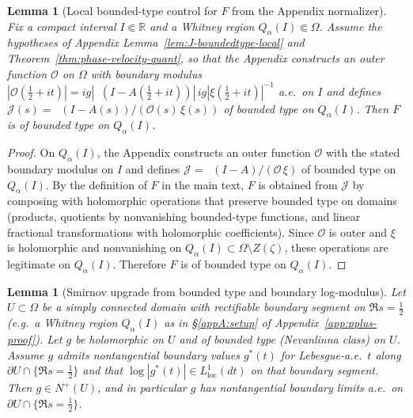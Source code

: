 \documentclass[11pt]{amsart}
\newtheorem{lemma}[theorem]{Lemma}
\theoremstyle{definition}
\theoremstyle{remark}
\newcommand{\R}{\mathbb{R}}
\DeclareMathOperator{\dettwo}{det_2}
\begin{document}
\begin{lemma}[Local bounded-type control for $F$ from the Appendix normalizer]\label{lem:F-boundedtype-from-J}
Fix a compact interval $I\Subset\R$ and a Whitney region $Q_{\alpha}(I)\Subset\Omega$.
Assume the hypotheses of Appendix Lemma~\ref{lem:J-boundedtype-local} and Theorem~\ref{thm:phase-velocity-quant},
so that the Appendix constructs an outer function $\mathcal O$ on $\Omega$ with boundary modulus
$|\mathcal O(\tfrac12+it)|=ig|\dettwo(I-A(\tfrac12+it))|\,ig|\xi(\tfrac12+it)|^{-1}$ a.e.\ on $I$ and defines
\(
\mathcal J(s)=\dettwo(I-A(s))/(\mathcal O(s)\,\xi(s))
\)
of bounded type on $Q_{\alpha}(I)$.
Then $F$ is of bounded type on $Q_{\alpha}(I)$.
\end{lemma}
\begin{proof}
On $Q_\alpha(I)$, the Appendix constructs an outer function $\mathcal O$ with the stated boundary modulus on $I$ and defines
\(
\mathcal J=\dettwo(I-A)/(\mathcal O\,\xi)
\)
of bounded type on $Q_\alpha(I)$.
By the definition of $F$ in the main text, $F$ is obtained from $\mathcal J$ by composing with holomorphic operations that preserve bounded type on domains
(products, quotients by nonvanishing bounded-type functions, and linear fractional transformations with holomorphic coefficients).
Since $\mathcal O$ is outer and $\xi$ is holomorphic and nonvanishing on $Q_\alpha(I)\subset \Omega\setminus Z(\zeta)$, these operations are legitimate on $Q_\alpha(I)$.
Therefore $F$ is of bounded type on $Q_\alpha(I)$.
\end{proof}
\begin{lemma}[Smirnov upgrade from bounded type and boundary log-modulus]\label{lem:BT-to-Nplus}
Let $U\subset\Omega$ be a simply connected domain with rectifiable boundary segment on $\Re s=\tfrac12$ (e.g.\ a Whitney region $Q_\alpha(I)$ as in §\ref{appA:setup} of Appendix~\ref{app:pplus-proof}).
Let $g$ be holomorphic on $U$ and of bounded type (Nevanlinna class) on $U$.
Assume $g$ admits nontangential boundary values $g^*(t)$ for Lebesgue-a.e.\ $t$ along $\partial U\cap\{\Re s=\tfrac12\}$ and that $\log|g^*(t)|\in L^1_{\mathrm{loc}}(dt)$ on that boundary segment.
Then $g\in N^+(U)$, and in particular $g$ has nontangential boundary limits a.e.\ on $\partial U\cap\{\Re s=\tfrac12\}$.
\end{lemma}
\end{document}

